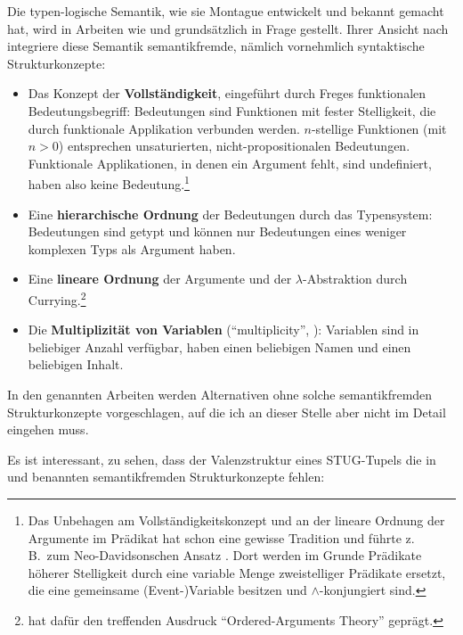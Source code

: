 {Die typen-logische Semantik, wie sie Montague entwickelt und bekannt gemacht hat, wird in Arbeiten wie \cite{Kracht:07,Kracht:11} und \cite{Erdelyi-Szabo:etal:08} grundsätzlich in Frage gestellt. Ihrer Ansicht nach integriere diese Semantik semantikfremde, nämlich vornehmlich syntaktische Strukturkonzepte:

\begin{itemize}
  \item Das Konzept der {\bf Vollständigkeit}, eingeführt durch Freges funktionalen Bedeutungsbegriff: Bedeutungen sind Funktionen mit fester Stelligkeit, die durch funktionale Applikation verbunden werden. $n$-stellige Funktionen (mit $n > 0$) entsprechen unsaturierten, nicht-propositionalen Bedeutungen. Funktionale Applikationen, in denen ein Argument fehlt, sind undefiniert, haben also keine Bedeutung.\footnote{Das Unbehagen am Vollständigkeitskonzept und an der lineare Ordnung der Argumente im Prädikat hat schon eine gewisse Tradition und führte z.\,B.\ zum Neo-Davidsonschen Ansatz \citep{Parsons:90,Parsons:95}. Dort werden im Grunde Prädikate höherer Stelligkeit durch eine variable Menge zweistelliger Prädikate ersetzt, die eine gemeinsame (Event-)Variable besitzen und $\wedge$-konjungiert sind.}
  \item Eine {\bf hierarchische Ordnung} der Bedeutungen durch das Typensystem: Bedeutungen sind getypt und können nur Bedeutungen eines weniger komplexen Typs als Argument haben.  
  \item Eine {\bf lineare Ordnung} der Argumente und der $\lambda$-Abstraktion durch Currying.\footnote{\cite{Dowty:89} hat dafür den treffenden Ausdruck "`Ordered-Arguments Theory"' geprägt.}
  \item Die {\bf Multiplizität von Variablen} ("`multiplicity"', \citealt{Kracht:07,Kracht:11}): Variablen sind in beliebiger Anzahl verfügbar, haben einen beliebigen Namen und einen beliebigen Inhalt.
\end{itemize}
In den genannten Arbeiten werden Alternativen ohne solche semantikfremden Strukturkonzepte vorgeschlagen, auf die ich an dieser Stelle aber nicht im Detail eingehen muss. 


Es ist interessant, zu sehen, dass der Valenzstruktur eines STUG-Tupels die in \cite{Kracht:07,Kracht:11} und \cite{Erdelyi-Szabo:etal:08} benannten semantikfremden Strukturkonzepte fehlen: 

}
